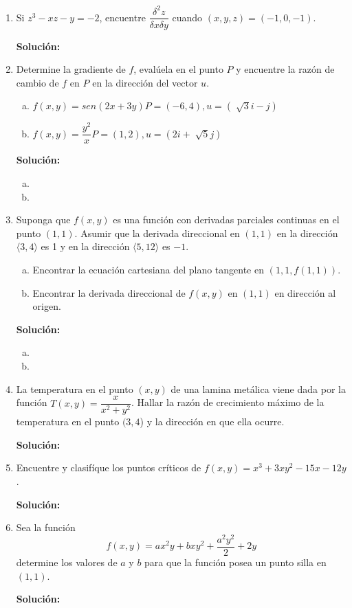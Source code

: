 \documentclass[12pt]{article}
\newenvironment{solucion}
{\begin{mdframed}[backgroundcolor=black!10]
		{\bf Solución:}\\
	}
	{
	\end{mdframed}
}
\newenvironment{preguntas}
{\begin{enumerate}\itemsep12pt
	}
	{
	\end{enumerate}
}
\begin{document}
\begin{preguntas}
\item Si $z^3 - xz - y = -2$, encuentre $\dfrac{\delta^2z}{\delta x \delta y}$ cuando $(x,y,z) = (-1, 0, -1)$.
\begin{solucion}

\end{solucion}
\item Determine la gradiente de $f$, evalúela en el punto $P$ y encuentre la razón de cambio de $f$ en $P$ en la dirección del vector $u$.
\begin{enumerate}[a)]
\item $f(x,y) = sen(2x+3y)$\tab$P=(-6,4), u=\left(\sqrt[]{3}i - j\right)$
\item $f(x,y) = \dfrac{y^2}{x}$\tab$P=(1,2), u=\left(2i + \sqrt[]{5}j\right)$
\end{enumerate}
\begin{solucion}

\begin{enumerate}[a)]
\item 
\item 
\end{enumerate}
\end{solucion}
\item Suponga que $f(x,y)$ es una función con derivadas parciales continuas en el punto $(1,1)$. Asumir que la derivada direccional en $(1,1)$ en la dirección $\langle3,4\rangle$ 			es 1 y en la dirección $\langle5,12\rangle$ es $-1$.
\begin{enumerate}[a)]
\item Encontrar la ecuación cartesiana del plano tangente en $(1,1,f(1,1))$.
\item Encontrar la derivada direccional de $f(x,y)$ en $(1,1)$ en dirección al origen.	
\end{enumerate}
\begin{solucion}

\begin{enumerate}[a)]
\item 
\item 
\end{enumerate}
\end{solucion}
\item La temperatura en el punto $(x,y)$ de una lamina metálica viene dada por la función $T(x,y) = \dfrac{x}{x^2+y^2}$. Hallar la razón de crecimiento máximo de la temperatura en el punto $(3,4$) y la dirección en que ella ocurre.
\begin{solucion}

\end{solucion}
\item Encuentre y clasifíque los puntos críticos de $f(x,y)=x^3+3xy^2-15x-12y$.
\begin{solucion}

\end{solucion}
\item Sea la función
	$$f(x,y)=ax^2y+bxy^2+\dfrac{a^2y^2}{2}+2y$$
	determine los valores de $a$ y $b$ para que la función posea un punto silla en $(1,1)$.
\begin{solucion}

\end{solucion}
\end{preguntas}
\end{document}
